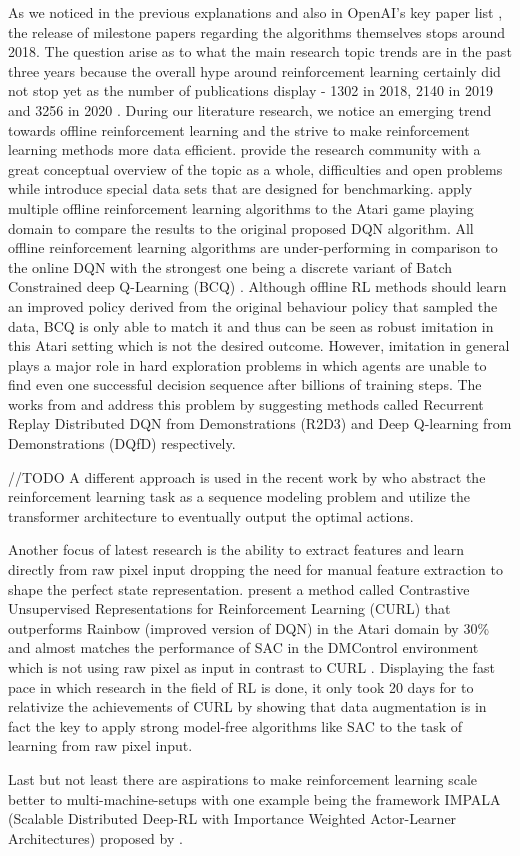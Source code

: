 \par
As we noticed in the previous explanations and also in OpenAI's key paper list \cite[]{keypaperlist}, the release of milestone papers regarding the algorithms themselves stops around 2018. The question arise as to what the main research topic trends are in the past three years because the overall hype around reinforcement learning certainly did not stop yet as the number of publications display - 1302 in 2018, 2140 in 2019 and 3256 in 2020 \cite[]{arxiv}. During our literature research, we notice an emerging trend towards offline reinforcement learning and the strive to make reinforcement learning methods more data efficient. \cite{levine2020offline} provide the research community with a great conceptual overview of the topic as a whole, difficulties and open problems while \cite{fu2021d4rl} introduce special data sets that are designed for benchmarking. \cite{fujimoto2019benchmarking} apply multiple offline reinforcement learning algorithms to the Atari game playing domain to compare the results to the original proposed DQN algorithm. All offline reinforcement learning algorithms are under-performing in comparison to the online DQN with the strongest one being a discrete variant of Batch Constrained deep Q-Learning (BCQ) \cite[pp.~7-9]{fujimoto2019benchmarking}. Although offline RL methods should learn an improved policy derived from the original behaviour policy that sampled the data, BCQ is only able to match it and thus can be seen as robust imitation in this Atari setting \cite[pp.~7]{fujimoto2019benchmarking} which is not the desired outcome.
However, imitation in general plays a major role in hard exploration problems in which agents are unable to find even one successful decision sequence after billions of training steps. The works from \cite{paine2019making} and \cite{hester2017deep} address this problem by suggesting methods called  Recurrent Replay Distributed DQN from Demonstrations (R2D3) and Deep Q-learning from Demonstrations (DQfD) respectively.
\par
//TODO
A different approach is used in the recent work by \cite{chen2021decision} who abstract the reinforcement learning task as a sequence modeling problem and utilize the transformer architecture to eventually output the optimal actions.
\par
Another focus of latest research is the ability to extract features and learn directly from raw pixel input dropping the need for manual feature extraction to shape the perfect state representation. \cite{srinivas2020curl} present a method called Contrastive Unsupervised Representations for Reinforcement Learning (CURL) that outperforms Rainbow (improved version of DQN) in the Atari domain by 30\% and almost matches the performance of SAC in the DMControl environment which is not using raw pixel as input in contrast to CURL \cite[p.~7]{srinivas2020curl}. Displaying the fast pace in which research in the field of RL is done, it only took 20 days for \cite{kostrikov2021image} to relativize the achievements of CURL by showing that data augmentation is in fact the key to apply strong model-free algorithms like SAC to the task of learning from raw pixel input.
\par 
Last but not least there are aspirations to make reinforcement learning scale 
better to multi-machine-setups with one example being the framework IMPALA (Scalable Distributed Deep-RL with Importance Weighted
Actor-Learner Architectures) proposed by \cite{espeholt2018impala}.